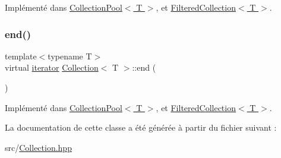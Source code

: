 Implémenté dans \hyperlink{class_collection_pool_ae13d478a26554da9211db064285c7b0b}{Collection\+Pool$<$ T $>$}, et \hyperlink{class_filtered_collection_a114f2b1557201e523a264d549926ab0a}{Filtered\+Collection$<$ T $>$}.

\mbox{\label{class_collection_ab5b98f651d0f49cde1be067c69c52e89}} 
\subsubsection{\texorpdfstring{end()}{end()}}
{\footnotesize\ttfamily template$<$typename T$>$ \\
virtual \hyperlink{class_collection_a317dca4fdf1eb2e47643bb60c620f802}{iterator} \hyperlink{class_collection}{Collection}$<$ T $>$\+::end (\begin{DoxyParamCaption}{ }\end{DoxyParamCaption})\hspace{0.3cm}{\ttfamily [pure virtual]}}



Implémenté dans \hyperlink{class_collection_pool_a870a85422595d6533688704ebe43b520}{Collection\+Pool$<$ T $>$}, et \hyperlink{class_filtered_collection_ae310c937df5035ef07f7d4de65fca18b}{Filtered\+Collection$<$ T $>$}.



La documentation de cette classe a été générée à partir du fichier suivant \+:\begin{DoxyCompactItemize}
\item 
src/\hyperlink{_collection_8hpp}{Collection.\+hpp}\end{DoxyCompactItemize}
